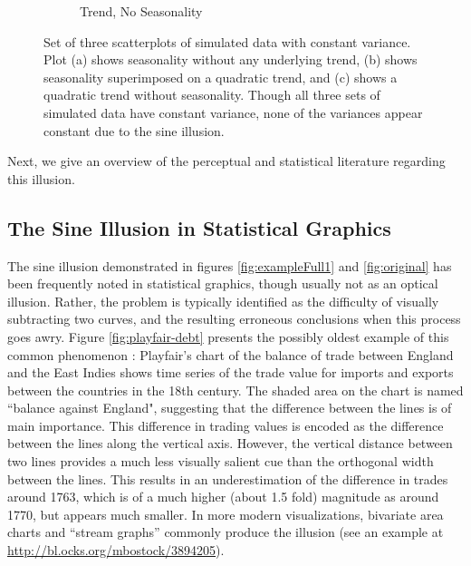 \documentclass[11pt]{isuthesis}\usepackage[]{graphicx}\usepackage[]{color}
\newenvironment{knitrout}{}{} %
\begin{document}
\begin{figure}[h!tbp]
\begin{subfigure}[b]{.31\linewidth}
\begin{knitrout}
{}



\end{knitrout}
  \caption{\small Trend, No Seasonality}
  \label{simulation3}
\end{subfigure}
\caption[Trend, seasonality, and the sine illusion]{Set of three scatterplots of simulated data with constant variance. Plot (a) shows seasonality without any underlying trend, (b) shows seasonality superimposed on a quadratic trend, and (c) shows a quadratic trend without seasonality. Though all three sets of simulated data have constant variance, none of the variances appear constant due to the sine illusion.}\label{fig:twoillusions-simulation}
\end{figure}

Next, we give an overview of the perceptual and statistical literature regarding this illusion.
\subsection{The Sine Illusion in Statistical Graphics}\label{statisticalgraphics}\hfill\newline
The sine illusion demonstrated in figures \ref{fig:exampleFull1} and \ref{fig:original} has been frequently noted in statistical graphics, though usually not as an optical illusion. Rather, the problem is typically identified as the difficulty of visually subtracting two curves, and the resulting erroneous conclusions when this process goes awry. Figure \ref{fig:playfair-debt} presents the possibly oldest example of this common phenomenon \citep{playfair, playfair2}: Playfair's chart of the balance of trade between England and the East Indies shows time series of the trade value for imports  and exports between the countries in the 18th century. The shaded area on the chart is named ``balance against England", suggesting that the difference between the lines is of main importance. This difference in trading values is encoded as the difference between the lines along the vertical axis. However, the vertical distance  between  two lines provides a  much less visually salient cue than the orthogonal width between the lines. This results in  an underestimation \citep{cleveland:1984} of the difference in trades around 1763, which is of a much higher (about 1.5 fold) magnitude as around 1770, but appears much smaller. In more modern visualizations, bivariate area charts and ``stream graphs'' \citep{stackedgraphs} commonly produce the illusion (see an example at \url{http://bl.ocks.org/mbostock/3894205}). 
\end{document}
